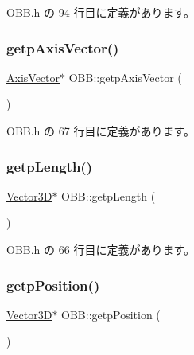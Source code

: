  O\+B\+B.\+h の 94 行目に定義があります。

\mbox{\label{class_o_b_b_aa79d651cda6be3bb1c9456566027f8f9}} 
\subsubsection{\texorpdfstring{getp\+Axis\+Vector()}{getpAxisVector()}}
{\footnotesize\ttfamily \mbox{\hyperlink{class_axis_vector}{Axis\+Vector}}$\ast$ O\+B\+B\+::getp\+Axis\+Vector (\begin{DoxyParamCaption}{ }\end{DoxyParamCaption})\hspace{0.3cm}{\ttfamily [inline]}}



 O\+B\+B.\+h の 67 行目に定義があります。

\mbox{\label{class_o_b_b_a6bdba6c807846b5eb1a3842981089479}} 
\subsubsection{\texorpdfstring{getp\+Length()}{getpLength()}}
{\footnotesize\ttfamily \mbox{\hyperlink{class_vector3_d}{Vector3D}}$\ast$ O\+B\+B\+::getp\+Length (\begin{DoxyParamCaption}{ }\end{DoxyParamCaption})\hspace{0.3cm}{\ttfamily [inline]}}



 O\+B\+B.\+h の 66 行目に定義があります。

\mbox{\label{class_o_b_b_a72d5af1f3234560445244447da2150e1}} 
\subsubsection{\texorpdfstring{getp\+Position()}{getpPosition()}}
{\footnotesize\ttfamily \mbox{\hyperlink{class_vector3_d}{Vector3D}}$\ast$ O\+B\+B\+::getp\+Position (\begin{DoxyParamCaption}{ }\end{DoxyParamCaption})\hspace{0.3cm}{\ttfamily [inline]}}



